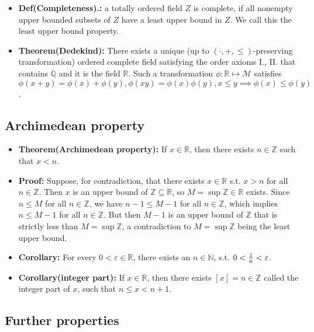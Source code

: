 \documentclass{article}
\begin{document}
\begin{itemize}
\item \textbf{Def(Completeness).:} a totally ordered field $Z$ is complete, if all nonempty upper bounded subsets of $Z$ have a least upper bound in $Z$. We call this the least upper bound property.

\item \textbf{Theorem(Dedekind):} There exists a unique (up to $(\cdot, +,\leq)$-preserving transformation) ordered complete field satisfying the order axioms I., II. that contains $\mathbb{Q}$ and it is the field $\mathbb{R}$.
Such a transformation $\phi:\mathbb{R}\mapsto \mathcal{M}$ satisfies $\phi(x+y)=\phi(x)+\phi(y), \phi(xy)=\phi(x)\phi(y), x\leq y \implies \phi(x)\leq \phi(y)$.
\end{itemize}

\subsection{Archimedean property}

\begin{itemize}
\item \textbf{Theorem(Archimedean property):} If $x\in \mathbb{R}$, then there exists $n\in \mathbb{Z}$ such that $x<n$.

\item \textbf{Proof:} Suppose, for contradiction, that there exists $x\in \mathbb{R}$ s.t. $x>n$ for all $n\in \mathbb{Z}$. Then $x$ is an upper bound of $\mathbb{Z\subseteq\mathbb{R}}$, so $M=\sup\mathbb{Z}\in\mathbb{R}$ exists. Since $n\leq M$ for all $n\in \mathbb{Z}$, we have $n-1\leq M-1$ for all $n\in \mathbb{Z}$, which implies $n\leq M-1$ for all $n\in \mathbb{Z}$. But then $M-1$ is an upper bound of $\mathbb{Z}$ that is strictly less than $M=\sup \mathbb{Z}$, a contradiction to $M=\sup \mathbb{Z}$ being the least upper bound.

\item \textbf{Corollary:} For every $0<\varepsilon\in \mathbb{R}$, there exists an $n\in \mathbb{N}$, s.t. $0<{1\over n}<\varepsilon$.

\item \textbf{Corollary(integer part):} If $x\in \mathbb{R}$, then there exists $[x]=n\in \mathbb{Z}$ called the integer part of $x$, such that $n\leq x<n+1$.
\end{itemize}

\subsection{Further properties}
\end{document}
